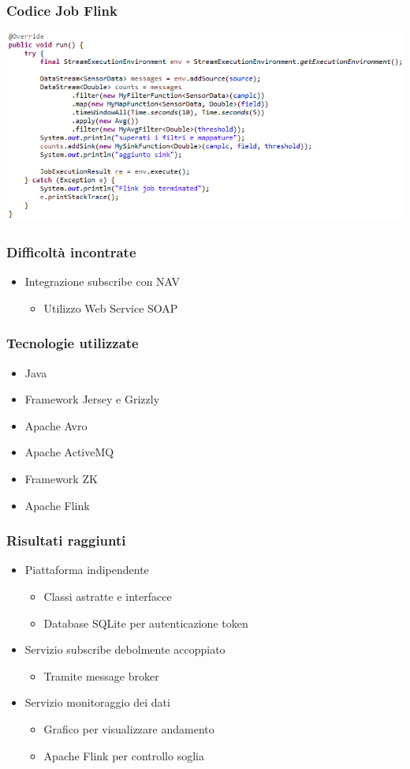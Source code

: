 \documentclass{beamer}
\begin{document}
\begin{frame}
\frametitle{Codice Job Flink}
\includegraphics[width=1\textwidth]{images/flink-job.png}
\end{frame}

\begin{frame}
\frametitle{Difficoltà incontrate}
\begin{itemize}
	\item Integrazione subscribe con NAV
	\begin{itemize}
		\item Utilizzo Web Service SOAP
	\end{itemize}
\end{itemize}
\end{frame}

\begin{frame}
\frametitle{Tecnologie utilizzate}
\begin{itemize}
	\item Java
	\item Framework Jersey e Grizzly
	\item Apache Avro
	\item Apache ActiveMQ
	\item Framework ZK
	\item Apache Flink
\end{itemize}
\end{frame}

\begin{frame}
\frametitle{Risultati raggiunti}
\begin{itemize}
	\item Piattaforma indipendente
	\begin{itemize}
		\item Classi astratte e interfacce
		\item Database SQLite per autenticazione token
	\end{itemize}
	\item Servizio subscribe debolmente accoppiato
	\begin{itemize}
		\item Tramite message broker
	\end{itemize}
	\item Servizio monitoraggio dei dati
	\begin{itemize}
		\item Grafico per visualizzare andamento
		\item Apache Flink per controllo soglia
	\end{itemize}
\end{itemize}
\end{frame}
\end{document}
